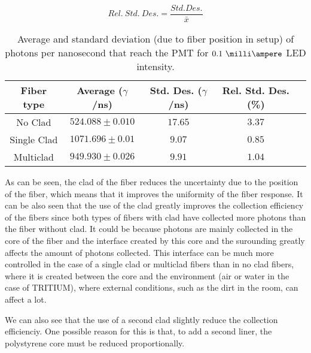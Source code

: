 \begin{equation}
Rel.~Std.~Des. = \frac{Std.Des.}{\bar{x}}
\label{eq:RelativeStandardDesviation}
\end{equation}

\begin{table}[htbp]
\begin{center}
\begin{tabular}{|c|c|c|c|c|}
\hline
Fiber type & Average ($\gamma$/ns) & Std. Des. ($\gamma$/ns) & Rel. Std. Des. (\%)\\
\hline \hline \hline
No Clad & $524.088 \pm 0.010$ & $17.65$ & $3.37$ \\ \hline
Single Clad & $1071.696 \pm 0.01$ & $9.07$ & $0.85$ \\ \hline
Multiclad & $949.930 \pm 0.026$ & $9.91$ & $1.04$ \\ \hline
\end{tabular}
\caption{Average and standard deviation (due to fiber position in setup) of photons per nanosecond that reach the PMT for $0.1~\milli\ampere$ LED intensity.}
\label{tab:PositionStandardDeviation}
\end{center}
\end{table}

As can be seen, the clad of the fiber reduces the uncertainty due to the position of the fiber, which means that it improves the uniformity of the fiber response. It can be also seen that the use of the clad greatly improves the collection efficiency of the fibers since both types of fibers with clad have collected more photons than the fiber without clad. It could be because photons are mainly collected in the core of the fiber and the interface created by this core and the surounding greatly affects the amount of photons collected. This interface can be much more controlled in the case of a single clad or multiclad fibers than in no clad fibers, where it is created between the core and the environment (air or water in the case of TRITIUM), where external conditions, such as the dirt in the room, can affect a lot.

We can also see that the use of a second clad slightly reduce the collection efficienciy. One possible reason for this is that, to add a second liner, the polystyrene core must be reduced proportionally.




